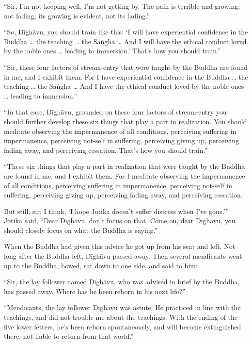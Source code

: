 \documentclass[12pt,openany]{book}%
\begin{document}
“Sir, I’m not keeping well, I’m not getting by. The pain is terrible and growing, not fading; its growing is evident, not its fading.” 

“So, \textsanskrit{Dīghāvu}, you should train like this: ‘I will have experiential confidence in the Buddha … the teaching … the \textsanskrit{Saṅgha} … And I will have the ethical conduct loved by the noble ones … leading to immersion.’ That’s how you should train.” 

“Sir, these four factors of stream-entry that were taught by the Buddha are found in me, and I exhibit them. For I have experiential confidence in the Buddha … the teaching … the \textsanskrit{Saṅgha} … And I have the ethical conduct loved by the noble ones … leading to immersion.” 

“In that case, \textsanskrit{Dīghāvu}, grounded on these four factors of stream-entry you should further develop these six things that play a part in realization. You should meditate observing the impermanence of all conditions, perceiving suffering in impermanence, perceiving not-self in suffering, perceiving giving up, perceiving fading away, and perceiving cessation. That’s how you should train.” 

“These six things that play a part in realization that were taught by the Buddha are found in me, and I exhibit them. For I meditate observing the impermanence of all conditions, perceiving suffering in impermanence, perceiving not-self in suffering, perceiving giving up, perceiving fading away, and perceiving cessation. 

But still, sir, I think, ‘I hope Jotika doesn’t suffer distress when I’ve gone.’” Jotika said, “Dear \textsanskrit{Dīghāvu}, don’t focus on that. Come on, dear \textsanskrit{Dīghāvu}, you should closely focus on what the Buddha is saying.” 

When the Buddha had given this advice he got up from his seat and left. Not long after the Buddha left, \textsanskrit{Dīghāvu} passed away. Then several mendicants went up to the Buddha, bowed, sat down to one side, and said to him: 

“Sir, the lay follower named \textsanskrit{Dīghāvu}, who was advised in brief by the Buddha, has passed away. Where has he been reborn in his next life?” 

“Mendicants, the lay follower \textsanskrit{Dīghāvu} was astute. He practiced in line with the teachings, and did not trouble me about the teachings. With the ending of the five lower fetters, he’s been reborn spontaneously, and will become extinguished there, not liable to return from that world.” 
\end{document}
